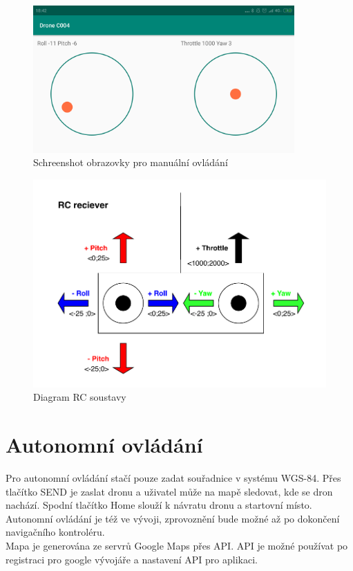 \begin{figure}[H]
	\centering
	\includegraphics[width=10cm]{pictures/app.png}
	\caption{Schreenshot obrazovky pro manuální ovládání}
\end{figure}

\begin{figure}[H]
	\centering
	\includegraphics[width=14cm]{pictures/rcDiagram.pdf}
	\caption{Diagram RC soustavy}
\end{figure}

\section{Autonomní ovládání} 
Pro autonomní ovládání stačí pouze zadat souřadnice v systému WGS-84. Přes tlačítko SEND je zaslat dronu a uživatel může na mapě sledovat, kde se dron nachází. Spodní tlačítko Home slouží k návratu dronu a startovní místo. Autonomní ovládání je též ve vývoji, zprovoznění bude možné až po dokončení navigačního kontroléru.\\
Mapa je generována ze servrů Google Maps přes API. API je možné používat po registraci pro google vývojáře a nastavení API pro aplikaci.\\

